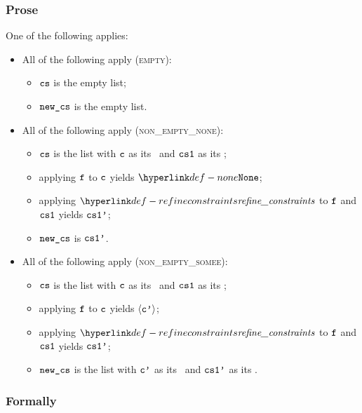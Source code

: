 \subsubsection{Prose}
One of the following applies:
\begin{itemize}
  \item All of the following apply (\textsc{empty}):
  \begin{itemize}
    \item $\cs$ is the empty list;
    \item $\newcs$ is the empty list.
  \end{itemize}

  \item All of the following apply (\textsc{non\_empty\_none}):
  \begin{itemize}
    \item $\cs$ is the list with $\vc$ as its \head\ and $\csone$ as its \tail;
    \item applying $\vf$ to $\vc$ yields $\None$;
    \item applying $\refineconstraints$ to $\vf$ and $\csone$ yields $\csonep$;
    \item $\newcs$ is $\csonep$.
  \end{itemize}

  \item All of the following apply (\textsc{non\_empty\_somee}):
  \begin{itemize}
    \item $\cs$ is the list with $\vc$ as its \head\ and $\csone$ as its \tail;
    \item applying $\vf$ to $\vc$ yields $\langle\vcp\rangle$;
    \item applying $\refineconstraints$ to $\vf$ and $\csone$ yields $\csonep$;
    \item $\newcs$ is the list with $\vcp$ as its \head\ and $\csonep$ as its \tail.
  \end{itemize}
\end{itemize}

\subsubsection{Formally}
\begin{mathpar}
\end{mathpar}

\begin{mathpar}
\end{mathpar}


